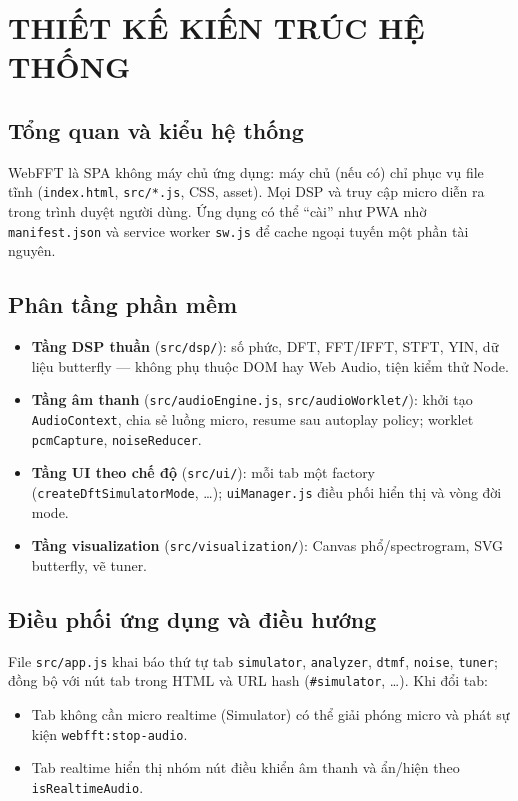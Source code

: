 \pagestyle{fancy}
\chapter{THIẾT KẾ KIẾN TRÚC HỆ THỐNG}

\section{Tổng quan và kiểu hệ thống}
WebFFT là SPA không máy chủ ứng dụng: máy chủ (nếu có) chỉ phục vụ file tĩnh (\texttt{index.html}, \texttt{src/*.js}, CSS, asset). Mọi DSP và truy cập micro diễn ra trong trình duyệt người dùng. Ứng dụng có thể ``cài'' như PWA nhờ \texttt{manifest.json} và service worker \texttt{sw.js} để cache ngoại tuyến một phần tài nguyên.

\section{Phân tầng phần mềm}
\begin{itemize}\itemsep2pt
	\item \textbf{Tầng DSP thuần} (\verb|src/dsp/|): số phức, DFT, FFT/IFFT, STFT, YIN, dữ liệu butterfly --- không phụ thuộc DOM hay Web Audio, tiện kiểm thử Node.
	\item \textbf{Tầng âm thanh} (\verb|src/audioEngine.js|, \verb|src/audioWorklet/|): khởi tạo \texttt{AudioContext}, chia sẻ luồng micro, resume sau autoplay policy; worklet \texttt{pcmCapture}, \texttt{noiseReducer}.
	\item \textbf{Tầng UI theo chế độ} (\verb|src/ui/|): mỗi tab một factory (\texttt{createDftSimulatorMode}, \ldots); \verb|uiManager.js| điều phối hiển thị và vòng đời mode.
	\item \textbf{Tầng visualization} (\verb|src/visualization/|): Canvas phổ/spectrogram, SVG butterfly, vẽ tuner.
\end{itemize}

\section{Điều phối ứng dụng và điều hướng}
File \verb|src/app.js| khai báo thứ tự tab \texttt{simulator}, \texttt{analyzer}, \texttt{dtmf}, \texttt{noise}, \texttt{tuner}; đồng bộ với nút tab trong HTML và URL hash (\texttt{\#simulator}, \ldots). Khi đổi tab:
\begin{itemize}\itemsep2pt
	\item Tab không cần micro realtime (Simulator) có thể giải phóng micro và phát sự kiện \texttt{webfft:stop-audio}.
	\item Tab realtime hiển thị nhóm nút điều khiển âm thanh và ẩn/hiện theo \texttt{isRealtimeAudio}.
\end{itemize}

